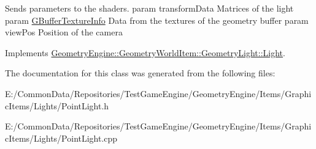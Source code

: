 Sends parameters to the shaders. param transform\+Data Matrices of the light param \mbox{\hyperlink{class_geometry_engine_1_1_g_buffer_texture_info}{G\+Buffer\+Texture\+Info}} Data from the textures of the geometry buffer param view\+Pos Position of the camera 

Implements \mbox{\hyperlink{class_geometry_engine_1_1_geometry_world_item_1_1_geometry_light_1_1_light_a366be5945389fe58df4bf5aa8c43138f}{Geometry\+Engine\+::\+Geometry\+World\+Item\+::\+Geometry\+Light\+::\+Light}}.



The documentation for this class was generated from the following files\+:\begin{DoxyCompactItemize}
\item 
E\+:/\+Common\+Data/\+Repositories/\+Test\+Game\+Engine/\+Geometry\+Engine/\+Items/\+Graphic\+Items/\+Lights/Point\+Light.\+h\item 
E\+:/\+Common\+Data/\+Repositories/\+Test\+Game\+Engine/\+Geometry\+Engine/\+Items/\+Graphic\+Items/\+Lights/Point\+Light.\+cpp\end{DoxyCompactItemize}

